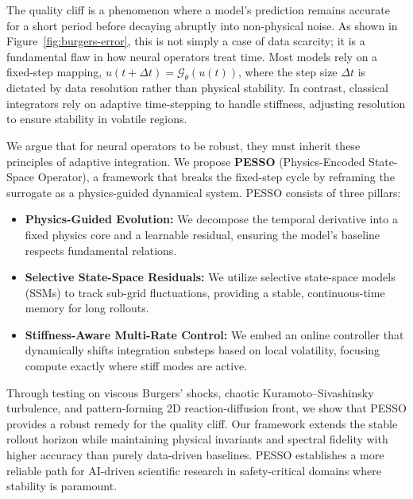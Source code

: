 \documentclass{article}
\theoremstyle{plain}
\theoremstyle{definition}
\theoremstyle{remark}
\begin{document}
The quality cliff is a phenomenon where a model's prediction remains accurate for a short period before decaying abruptly into non-physical noise. As shown in Figure~\ref{fig:burgers-error}, this is not simply a case of data scarcity; it is a fundamental flaw in how neural operators treat time. Most models rely on a fixed-step mapping, $u(t + \Delta t) = \mathcal{G}_\theta(u(t))$, where the step size $\Delta t$ is dictated by data resolution rather than physical stability. In contrast, classical integrators rely on adaptive time-stepping to handle stiffness, adjusting resolution to ensure stability in volatile regions.

We argue that for neural operators to be robust, they must inherit these principles of adaptive integration. We propose \textbf{PESSO} (Physics-Encoded State-Space Operator), a framework that breaks the fixed-step cycle by reframing the surrogate as a physics-guided dynamical system. PESSO consists of three pillars:
\begin{itemize}
    \item \textbf{Physics-Guided Evolution:} We decompose the temporal derivative into a fixed physics core and a learnable residual, ensuring the model's baseline respects fundamental relations.
    \item \textbf{Selective State-Space Residuals:} We utilize selective state-space models (SSMs) \cite{gu2023mamba} to track sub-grid fluctuations, providing a stable, continuous-time memory for long rollouts.
    \item \textbf{Stiffness-Aware Multi-Rate Control:} We embed an online controller that dynamically shifts integration substeps based on local volatility, focusing compute exactly where stiff modes are active.
\end{itemize}


Through testing on viscous Burgers' shocks, chaotic Kuramoto--Sivashinsky turbulence, and pattern-forming 2D reaction-diffusion front, we show that PESSO provides a robust remedy for the quality cliff. Our framework extends the stable rollout horizon while maintaining physical invariants and spectral fidelity with higher accuracy than purely data-driven baselines. PESSO establishes a more reliable path for AI-driven scientific research in safety-critical domains where stability is paramount.
\end{document}
